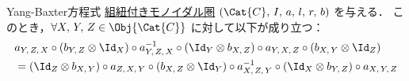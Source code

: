 \documentclass[TQFT_main]{subfiles}
\begin{document}
\begin{myprop}[label=prop:YBeq]{Yang-Baxter方程式}
    \hyperref[redef:braided-monoidal]{組紐付きモノイダル圏} $(\Cat{C},\, I,\, a,\, l,\, r,\, b)$ を与える．
    このとき，$\forall X,\, Y,\, Z \in \Obj{\Cat{C}}$ に対して以下が成り立つ：
    \begin{align}
        &a_{Y,\, Z,\, X} \circ (b_{Y,\, Z} \otimes \Id_X) \circ a_{Y,\, Z,\, X}^{-1} \circ (\Id_Y \otimes b_{X,\, Z}) \circ a_{Y,\, X,\, Z} \circ (b_{X,\, Y} \otimes \Id_Z) \\
        &= (\Id_{Z} \otimes b_{X,\, Y}) \circ a_{Z,\, X,\, Y} \circ (b_{X,\, Z} \otimes \Id_{Y}) \circ a_{X,\, Z,\, Y}^{-1} \circ (\Id_{X} \otimes b_{Y,\, Z}) \circ a_{X,\, Y,\, Z}
    \end{align}
\end{myprop}
\end{document}
